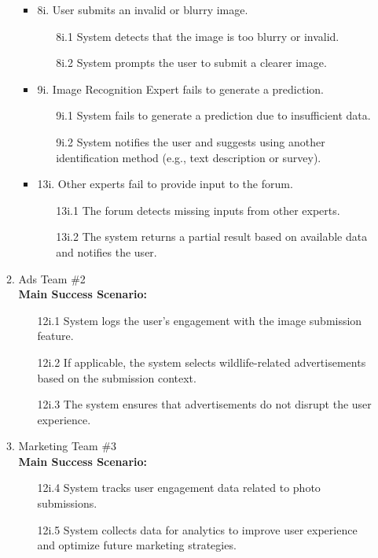 \documentclass[]{article}
\begin{document}
\begin{enumerate}[{\bf BE1.}]
\begin{enumerate}[{\bf VP1.}]
\begin{itemize}
            \item 8i. User submits an invalid or blurry image.
            \begin{enumerate}
                \item[8i.1] System detects that the image is too blurry or invalid.
                \item[8i.2] System prompts the user to submit a clearer image.
            \end{enumerate}
            
            \item 9i. Image Recognition Expert fails to generate a prediction.
            \begin{enumerate}
                \item[9i.1] System fails to generate a prediction due to insufficient data.
                \item[9i.2] System notifies the user and suggests using another identification method (e.g., text description or survey).
            \end{enumerate}
            
            \item 13i. Other experts fail to provide input to the forum.
            \begin{enumerate}
                \item[13i.1] The forum detects missing inputs from other experts.
                \item[13i.2] The system returns a partial result based on available data and notifies the user.
            \end{enumerate}
        \end{itemize}

    \item Ads Team \#2 \\
        \newline \textbf{Main Success Scenario:}
        \begin{enumerate}
            \item[12i.1] System logs the user's engagement with the image submission feature.
            \item[12i.2] If applicable, the system selects wildlife-related advertisements based on the submission context.
            \item[12i.3] The system ensures that advertisements do not disrupt the user experience.
        \end{enumerate}
        
    \item Marketing Team \#3 \\
        \newline \textbf{Main Success Scenario:}
        \begin{enumerate}
            \item[12i.4] System tracks user engagement data related to photo submissions.
            \item[12i.5] System collects data for analytics to improve user experience and optimize future marketing strategies.
        \end{enumerate}


\end{enumerate}
\end{enumerate}
\end{document}
